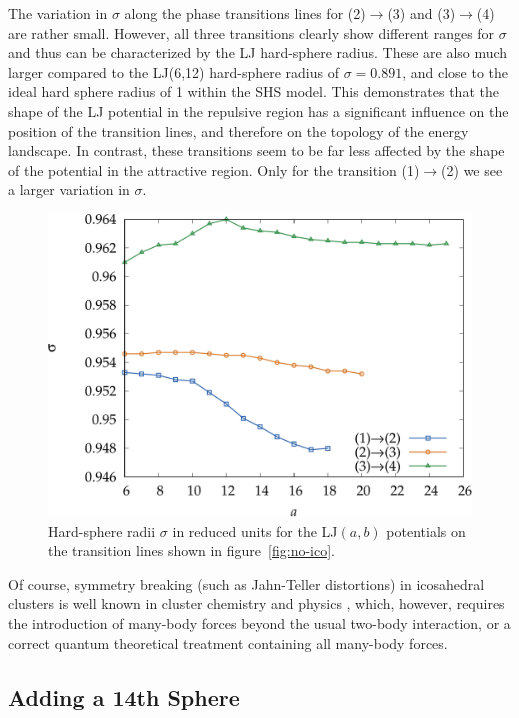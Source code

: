 The variation in $\sigma$ along the phase transitions lines for (2)$\rightarrow$(3)
and (3)$\rightarrow$(4) are rather small. However, all three
transitions clearly show different ranges for $\sigma$ and thus can be
characterized by the LJ hard-sphere radius. These are also
much larger compared to the LJ(6,12) hard-sphere radius of $\sigma=0.891$,
and close to the ideal hard sphere radius of 1 within the SHS model. 
This demonstrates that the shape of the LJ potential in the
repulsive region has a significant influence on the position of the transition lines, 
and therefore on the topology of the energy landscape. In contrast, these 
transitions seem to be far less affected by the shape of the potential in the attractive region. 
Only for the transition (1)$\rightarrow$(2) we see a larger variation in $\sigma$.
\begin{figure}[htb]\centering
    \includegraphics[width=.8\columnwidth]{gregory-newton/sigma.pdf}
    \caption{Hard-sphere radii $\sigma$ in reduced units for the LJ$(a,b)$
    potentials on the transition lines shown in figure~\ref{fig:no-ico}.}
    \label{fig:hardsphere}
\end{figure}

Of course, symmetry breaking (such as Jahn-Teller distortions) in icosahedral
clusters is well known in cluster chemistry and physics
\autocite{deHeer_physicssimplemetal_1993}, which, however, requires the
introduction of many-body forces beyond the usual two-body interaction, or a
correct quantum theoretical treatment containing all many-body forces. 

\subsection{Adding a 14th Sphere}
\label{sec:addinga14thsphere}

